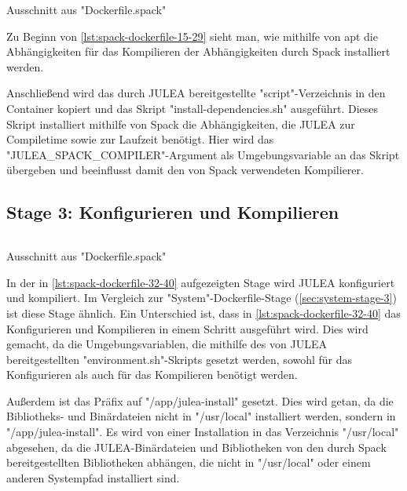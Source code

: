 \begin{listing}[H]
    \inputminted[firstline=15,lastline=29]{dockerfile}{./code-examples/Dockerfile.spack}
    \caption{Ausschnitt aus "Dockerfile.spack"}
    \label{lst:spack-dockerfile-15-29}
\end{listing}

Zu Beginn von \cref{lst:spack-dockerfile-15-29} sieht man, wie mithilfe von apt die Abhängigkeiten für das Kompilieren der Abhängigkeiten durch Spack installiert werden. 

Anschließend wird das durch JULEA bereitgestellte "script"-Verzeichnis in den Container kopiert und das Skript "install-dependencies.sh" ausgeführt. Dieses Skript installiert mithilfe von Spack die Abhängigkeiten, die JULEA zur Compiletime sowie zur Laufzeit benötigt. Hier wird das "JULEA\_SPACK\_COMPILER"-Argument als Umgebungsvariable an das Skript übergeben und beeinflusst damit den von Spack verwendeten Kompilierer.


\subsection{Stage 3: Konfigurieren und Kompilieren} \label{sec:spack-stage-3}

\begin{listing}[H]
    \inputminted[firstline=32,lastline=40]{dockerfile}{./code-examples/Dockerfile.spack}
    \caption{Ausschnitt aus "Dockerfile.spack"}
    \label{lst:spack-dockerfile-32-40}
\end{listing}

In der in \cref{lst:spack-dockerfile-32-40} aufgezeigten Stage wird JULEA konfiguriert und kompiliert. Im Vergleich zur "System"-Dockerfile-Stage (\cref{sec:system-stage-3}) ist diese Stage ähnlich. Ein Unterschied ist, dass in \cref{lst:spack-dockerfile-32-40} das Konfigurieren und Kompilieren in einem Schritt ausgeführt wird. Dies wird gemacht, da die Umgebungsvariablen, die mithilfe des von JULEA bereitgestellten "environment.sh"-Skripts gesetzt werden, sowohl für das Konfigurieren als auch für das Kompilieren benötigt werden. 

Außerdem ist das Präfix auf "/app/julea-install" gesetzt. Dies wird getan, da die Bibliotheks- und Binärdateien nicht in "/usr/local" installiert werden, sondern in "/app/julea-install". Es wird von einer Installation in das Verzeichnis "/usr/local" abgesehen, da die JULEA-Binärdateien und Bibliotheken von den durch Spack bereitgestellten Bibliotheken abhängen, die nicht in "/usr/local" oder einem anderen Systempfad installiert sind. 

